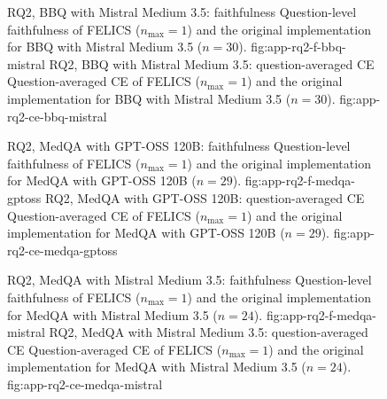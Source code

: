 \begin{figure}[H]
  \centering
    {RQ2, BBQ with Mistral Medium 3.5: faithfulness}%
    {Question-level faithfulness of FELICS ($n_{\max}=1$) and the original implementation for BBQ with Mistral Medium 3.5 ($n=30$).}%
    {fig:app-rq2-f-bbq-mistral}%
  \hfill
    {RQ2, BBQ with Mistral Medium 3.5: question-averaged CE}%
    {Question-averaged CE of FELICS ($n_{\max}=1$) and the original implementation for BBQ with Mistral Medium 3.5 ($n=30$).}%
    {fig:app-rq2-ce-bbq-mistral}%
\end{figure}

\begin{figure}[H]
  \centering
    {RQ2, MedQA with GPT-OSS 120B: faithfulness}%
    {Question-level faithfulness of FELICS ($n_{\max}=1$) and the original implementation for MedQA with GPT-OSS 120B ($n=29$).}%
    {fig:app-rq2-f-medqa-gptoss}%
  \hfill
    {RQ2, MedQA with GPT-OSS 120B: question-averaged CE}%
    {Question-averaged CE of FELICS ($n_{\max}=1$) and the original implementation for MedQA with GPT-OSS 120B ($n=29$).}%
    {fig:app-rq2-ce-medqa-gptoss}%
\end{figure}

\begin{figure}[H]
  \centering
    {RQ2, MedQA with Mistral Medium 3.5: faithfulness}%
    {Question-level faithfulness of FELICS ($n_{\max}=1$) and the original implementation for MedQA with Mistral Medium 3.5 ($n=24$).}%
    {fig:app-rq2-f-medqa-mistral}%
  \hfill
    {RQ2, MedQA with Mistral Medium 3.5: question-averaged CE}%
    {Question-averaged CE of FELICS ($n_{\max}=1$) and the original implementation for MedQA with Mistral Medium 3.5 ($n=24$).}%
    {fig:app-rq2-ce-medqa-mistral}%
\end{figure}

